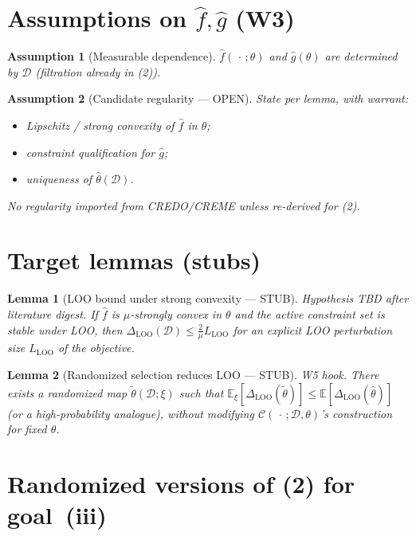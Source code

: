 \documentclass[11pt]{article}
\newtheorem{assumption}{Assumption}
\newtheorem{lemma}{Lemma}
\begin{document}
\section{Assumptions on $\hat f,\hat g$ (W3)}

\begin{assumption}[Measurable dependence]
$\hat f(\,\cdot\,;\theta)$ and $\hat g(\theta)$ are determined by $\mathcal{D}$
(filtration already in (2)).
\end{assumption}

\begin{assumption}[Candidate regularity --- OPEN]
State per lemma, with warrant:
\begin{itemize}
  \item Lipschitz / strong convexity of $\hat f$ in $\theta$;
  \item constraint qualification for $\hat g$;
  \item uniqueness of $\hat\theta(\mathcal{D})$.
\end{itemize}
No regularity imported from CREDO/CREME unless re-derived for (2).
\end{assumption}

\section{Target lemmas (stubs)}

\begin{lemma}[LOO bound under strong convexity --- STUB]
\label{lem:loo-sc}
\textit{Hypothesis TBD after literature digest.}
If $\hat f$ is $\mu$-strongly convex in $\theta$ and the active constraint set is
stable under LOO, then $\Delta_{\mathrm{LOO}}(\mathcal{D})\le \frac{2}{\mu} L_{\mathrm{LOO}}$
for an explicit LOO perturbation size $L_{\mathrm{LOO}}$ of the objective.
\end{lemma}

\begin{lemma}[Randomized selection reduces LOO --- STUB]
\label{lem:rand-loo}
\textit{W5 hook.}
There exists a randomized map $\tilde\theta(\mathcal{D};\xi)$ such that
$\mathbb{E}_\xi[\Delta_{\mathrm{LOO}}(\tilde\theta)]
\le
\mathbb{E}[\Delta_{\mathrm{LOO}}(\hat\theta)]$
(or a high-probability analogue), without modifying $\mathcal{C}(\,\cdot\,;\mathcal{D},\theta)$'s
construction for fixed $\theta$.
\end{lemma}

\section{Randomized versions of (2) for goal~(iii)}
\end{document}
